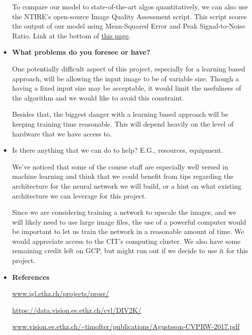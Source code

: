 \begin{itemize}
  To compare our model to state-of-the-art algos quantitatively, we can also use the NTIRE's open-source Image Quality Assessment script. This script scores the output of our model using Mean-Squared Error and Peak Signal-to-Noise Ratio. Link at the bottom of \href{https://data.vision.ee.ethz.ch/cvl/DIV2K/}{this page}.
 
  \item \textbf{What problems do you foresee or have?}
  
  One potentially difficult aspect of this project, especially for a learning based approach, will be allowing the input image to be of variable size. Though a having a fixed input size may be acceptable, it would limit the usefulness of the algorithm and we would like to avoid this constraint.
  
  Besides that, the biggest danger with a learning based approach will be keeping training time reasonable. This will depend heavily on the level of hardware that we have access to. 

  \item Is there anything that we can do to help? E.G., resources, equipment.
  
  We've noticed that some of the course staff are especially well versed in machine learning and think that we could benefit from tips regarding the architecture for the neural network we will build, or a hint on what existing architecture we can leverage for this project. 
  
  Since we are considering training a network to upscale the images, and we will likely need to use large image files, the use of a powerful computer would be important to let us train the network in a reasonable amount of time. We would appreciate access to the CIT's computing cluster. We also have some remaining credit left on GCP, but might run out if we decide to use it for this project.
 
  \item \textbf{References}
  
  \url{www.igl.ethz.ch/projects/prosr/}
  
  \url{https://data.vision.ee.ethz.ch/cvl/DIV2K/}
  
  \url{www.vision.ee.ethz.ch/~timofter/publications/Agustsson-CVPRW-2017.pdf}
  
\end{itemize}



